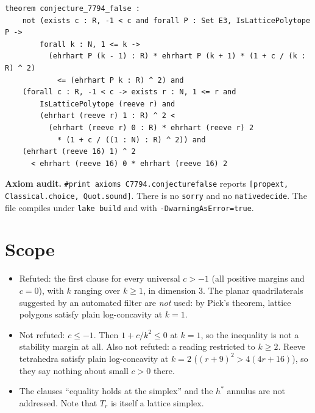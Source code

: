 \documentclass[11pt]{article}
\renewcommand{\_}{\oldus\allowbreak}
\theoremstyle{definition}
\begin{document}
\begin{verbatim}
theorem conjecture_7794_false :
    not (exists c : R, -1 < c and forall P : Set E3, IsLatticePolytope P ->
        forall k : N, 1 <= k ->
          (ehrhart P (k - 1) : R) * ehrhart P (k + 1) * (1 + c / (k : R) ^ 2)
            <= (ehrhart P k : R) ^ 2) and
    (forall c : R, -1 < c -> exists r : N, 1 <= r and
        IsLatticePolytope (reeve r) and
        (ehrhart (reeve r) 1 : R) ^ 2 <
          (ehrhart (reeve r) 0 : R) * ehrhart (reeve r) 2
            * (1 + c / ((1 : N) : R) ^ 2)) and
    (ehrhart (reeve 16) 1) ^ 2
      < ehrhart (reeve 16) 0 * ehrhart (reeve 16) 2
\end{verbatim}

\textbf{Axiom audit.} \texttt{\#print axioms C7794.conjecture\_7794\_false} reports
\texttt{[propext, Classical.choice, Quot.sound]}. There is no \texttt{sorry} and no
\texttt{native\_decide}. The file compiles under \texttt{lake build} and with
\texttt{-DwarningAsError=true}.

\section{Scope}

\begin{itemize}
\item Refuted: the first clause for every universal $c > -1$ (all positive margins and $c = 0$), with $k$
ranging over $k \ge 1$, in dimension 3. The planar quadrilaterals suggested by an automated filter are
\emph{not} used: by Pick's theorem, lattice polygons satisfy plain log-concavity at $k = 1$.
\item Not refuted: $c \le -1$. Then $1 + c/k^2 \le 0$ at $k = 1$, so the inequality is not a stability
margin at all. Also not refuted: a reading restricted to $k \ge 2$. Reeve tetrahedra satisfy plain
log-concavity at $k = 2$ ($(r+9)^2 > 4(4r+16)$), so they say nothing about small $c > 0$ there.
\item The clauses ``equality holds at the simplex'' and the $h^*$ annulus are not addressed. Note that
$T_r$ is itself a lattice simplex.
\end{itemize}
\end{document}
